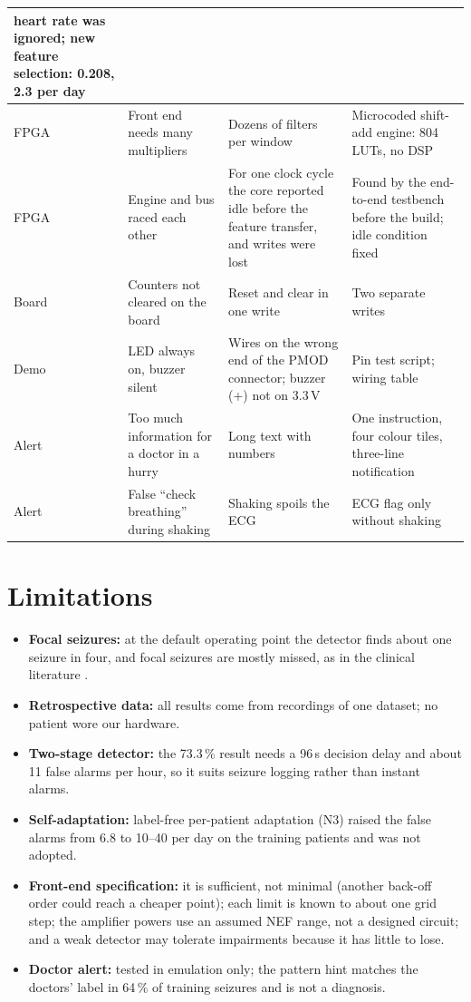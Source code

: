 \begin{xltabular}{\textwidth}{|P{17mm}|P{38mm}|L|L|}
heart rate was ignored; new feature selection: 0.208, 2.3 per day\\ \hline
\small FPGA & \small Front end needs many multipliers & \small Dozens of filters per window & \small Microcoded shift-add
engine: 804 LUTs, no DSP\\ \hline
\small FPGA & \small Engine and bus raced each other & \small For one clock cycle the core reported idle before the
feature transfer, and writes were lost & \small Found by the end-to-end testbench before the build; idle condition
fixed\\ \hline
\small Board & \small Counters not cleared on the board & \small Reset and clear in one write & \small Two separate
writes\\ \hline
\small Demo & \small LED always on, buzzer silent & \small Wires on the wrong end of the PMOD connector; buzzer (+) not
on 3.3\,V & \small Pin test script; wiring table\\ \hline
\small Alert & \small Too much information for a doctor in a hurry & \small Long text with numbers & \small One
instruction, four colour tiles, three-line notification\\ \hline
\small Alert & \small False ``check breathing'' during shaking & \small Shaking spoils the ECG & \small ECG flag only
without shaking\\ \hline
\end{xltabular}

\section{Limitations}

\begin{itemize}
\item \textbf{Focal seizures:} at the default operating point the detector finds about one seizure in four, and focal
  seizures are mostly missed, as in the clinical literature \cite{beniczky2021guideline}.
\item \textbf{Retrospective data:} all results come from recordings of one dataset; no patient wore our hardware.
\item \textbf{Two-stage detector:} the 73.3\,\% result needs a 96\,s decision delay and about 11 false alarms per
  hour, so it suits seizure logging rather than instant alarms.
\item \textbf{Self-adaptation:} label-free per-patient adaptation (N3) raised the false alarms from 6.8 to 10--40 per
  day on the training patients and was not adopted.
\item \textbf{Front-end specification:} it is sufficient, not minimal (another back-off order could reach a cheaper
  point); each limit is known to about one grid step; the amplifier powers use an assumed NEF range, not a designed
  circuit; and a weak detector may tolerate impairments because it has little to lose.
\item \textbf{Doctor alert:} tested in emulation only; the pattern hint matches the doctors' label in 64\,\% of
  training seizures and is not a diagnosis.
\end{itemize}
